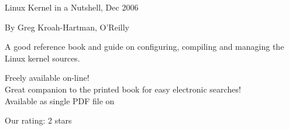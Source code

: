     Linux Kernel in a Nutshell, Dec 2006
    \startitemize
    \item By Greg Kroah-Hartman, O'Reilly\\
    \item A good reference book and guide on configuring, compiling
      and managing the Linux kernel sources.
    \item Freely available on-line!\\
      Great companion to the printed book for easy electronic searches!\\
      Available as single PDF file on
    \item Our rating: 2 stars
    \stopitemize


